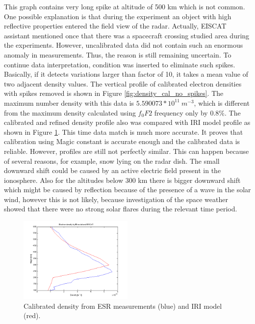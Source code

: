 \documentclass{article}
\begin{document}
This graph contains very long spike at altitude of 500 km which is not common. One possible explanation is that during the experiment an object with high reflective properties entered the field view of the radar. Actually, EISCAT assistant mentioned once that there was a spacecraft crossing studied area during the experiments. However, uncalibrated data did not contain such an enormous anomaly in measurements. Thus, the reason is still remaining uncertain. To continue data interpretation, condition was inserted to eliminate such spikes. Basically, if it detects variations larger than factor of 10, it takes a mean value of two adjacent density values. The vertical profile of calibrated electron densities with spikes removed is shown in Figure \ref{fig:density_cal_no_spikes}. The maximum number density with this data is $5.590073*10^{11}\:m^{-3}$, which is different from the maximum density calculated using $f_0F2$ frequency only by 0.8\%. The calibrated and refined density profile also was compared with IRI model profile as shown in Figure \ref{fig:iri_eiscat}. This time data match is much more accurate. It proves that calibration using Magic constant is accurate enough and the calibrated data is reliable. However, profiles are still not perfectly similar. This can happen because of several reasons, for example, snow lying on the radar dish. The small downward shift could be caused by an active electric field present in the ionosphere. \cite{Stoffregen:1969ed} Also for the altitudes below 300 km there is bigger downward shift which might be caused by reflection because of the presence of a wave in the solar wind, however this is not likely, because investigation of the space weather showed that there were no strong solar flares during the relevant time period.
\begin{figure}[h!tb]
	\centering
	\includegraphics[width=0.5\textwidth]{Figures/iri_eiscat.png}
	\caption{Calibrated density from ESR measurements (blue) and IRI model (red).}
	\label{fig:iri_eiscat}
\end{figure}
\end{document}

